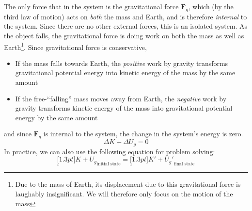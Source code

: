 The only force that in the system is the gravitational force $\bm F_g$,
which (by the third law of motion) acts on \emph{both} the mass and Earth, and
is therefore \emph{internal} to the system. Since there are no other external
forces, this is an isolated system.
As the object falls, the gravitational force is doing work on both the mass as
well as Earth\footnote{Due to the mass of Earth, its displacement due
to this gravitational force is laughably insignificant. We will therefore only
focus on the motion of the mass}. Since gravitational force is conservative,
\begin{itemize}[leftmargin=15pt,topsep=0pt,itemsep=3pt]
\item If the mass falls towards Earth, the \emph{positive} work by gravity
  transforms gravitational potential energy into kinetic energy of the mass by
  the same amount
\item If the free-``falling'' mass moves away from Earth, the \emph{negative}
  work by gravity transforms kinetic energy of the mass into gravitational
  potential energy by the same amount
\end{itemize}
and since $\bm F_g$ is internal to the system, the change in the system's
energy is zero.
\begin{equation}
  \Delta K + \Delta U_g=0
\end{equation}
In practice, we can also use the following equation for problem solving:
\begin{equation}
  \underbracket[1.3pt]{K+U_g}_\text{initial state}
  =\underbracket[1.3pt]{K'+U_g'}_\text{final state}
\end{equation}

